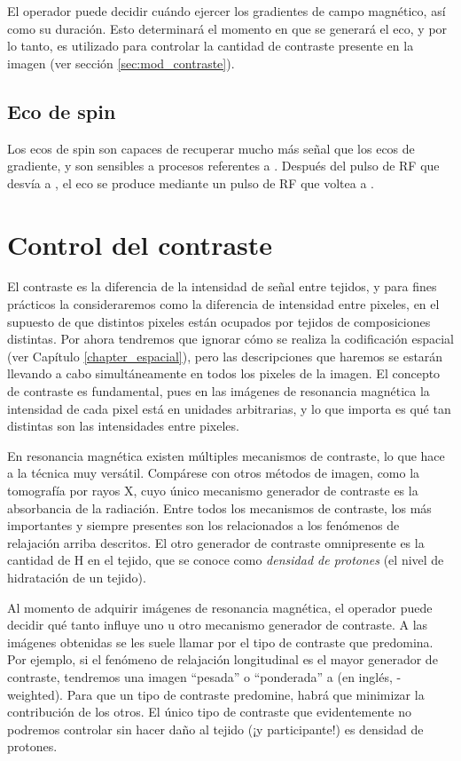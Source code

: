 El operador puede decidir cuándo ejercer los gradientes de campo magnético, así como su duración. Esto determinará el momento en que se generará el eco, y por lo tanto, es utilizado para controlar la cantidad de contraste \Ttwostar presente en la imagen (ver sección \ref{sec:mod_contraste}).


\subsection{Eco de spin}
Los ecos de spin son capaces de recuperar mucho más señal que los ecos de gradiente, y son sensibles a procesos referentes a \Ttwo. Después del pulso de RF que desvía a \M, el eco se produce mediante un pulso de RF que voltea a \degrees. \figurapendiente


\section{Control del contraste}
El contraste es la diferencia de la intensidad de señal entre tejidos, y para fines prácticos la consideraremos como la diferencia de intensidad entre pixeles, en el supuesto de que distintos pixeles están ocupados por tejidos de composiciones distintas. Por ahora tendremos que ignorar cómo se realiza la codificación espacial (ver Capítulo \ref{chapter_espacial}), pero las descripciones que haremos se estarán llevando a cabo simultáneamente en todos los pixeles de la imagen. El concepto de contraste es fundamental, pues en las imágenes de resonancia magnética la intensidad de cada pixel está en unidades arbitrarias, y lo que importa es qué tan distintas son las intensidades entre pixeles.

En resonancia magnética existen múltiples mecanismos de contraste, lo que hace a la técnica muy versátil. Compárese con otros métodos de imagen, como la tomografía por rayos X, cuyo único mecanismo generador de contraste es la absorbancia de la radiación. Entre todos los mecanismos de contraste, los más importantes y siempre presentes son los relacionados a los fenómenos de relajación arriba descritos. El otro generador de contraste omnipresente es la cantidad de H en el tejido, que se conoce como \textit{densidad de protones} (el nivel de hidratación de un tejido). 

Al momento de adquirir imágenes de resonancia magnética, el operador puede decidir qué tanto influye uno u otro mecanismo generador de contraste. A las imágenes obtenidas se les suele llamar por el tipo de contraste que predomina. Por ejemplo, si el fenómeno de relajación longitudinal es el mayor generador de contraste, tendremos una imagen ``pesada'' o ``ponderada'' a \Tone (en inglés, \Tone-weighted). Para que un tipo de contraste predomine, habrá que minimizar la contribución de los otros. El único tipo de contraste que evidentemente no podremos controlar sin hacer daño al tejido (¡y participante!) es densidad de protones.

